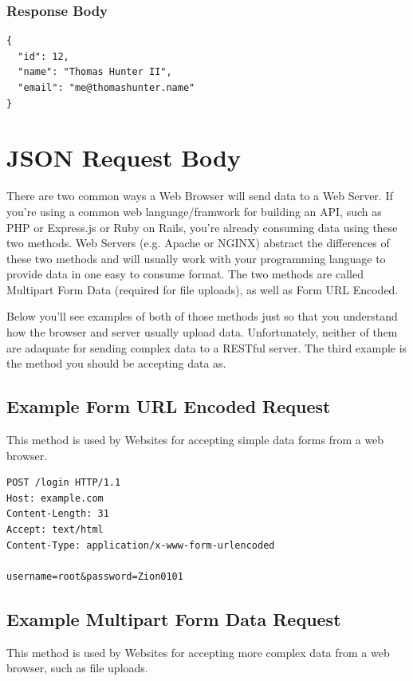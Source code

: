 \documentclass{book}
\begin{document}
\subsection{Response Body}

\begin{verbatim}
{
  "id": 12,
  "name": "Thomas Hunter II",
  "email": "me@thomashunter.name"
}
\end{verbatim}


\chapter{JSON Request Body}

There are two common ways a Web Browser will send data to a Web Server. If you're using a common web language/framwork for building an API, such as PHP or Express.js or Ruby on Rails, you're already consuming data using these two methods. Web Servers (e.g. Apache or NGINX) abstract the differences of these two methods and will usually work with your programming language to provide data in one easy to consume format. The two methods are called Multipart Form Data (required for file uploads), as well as Form URL Encoded.

Below you'll see examples of both of those methods just so that you understand how the browser and server usually upload data. Unfortunately, neither of them are adaquate for sending complex data to a RESTful server. The third example is the method you should be accepting data as.

\section{Example Form URL Encoded Request}

This method is used by Websites for accepting simple data forms from a web browser.

\begin{verbatim}
POST /login HTTP/1.1
Host: example.com
Content-Length: 31
Accept: text/html
Content-Type: application/x-www-form-urlencoded

username=root&password=Zion0101
\end{verbatim}

\section{Example Multipart Form Data Request}

This method is used by Websites for accepting more complex data from a web browser, such as file uploads.
\end{document}

